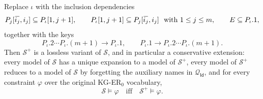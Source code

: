 \documentclass[10pt]{article}
\newcommand{\ols}[1]{\mskip.5\thinmuskip\overline{\mskip-.5\thinmuskip {#1} \mskip-.5\thinmuskip}\mskip.5\thinmuskip} %
\begin{document}
\noindent
Replace \(\iota\) with the inclusion dependencies
\[
P_j[\ols{i_j},i_j]\subseteq P_\iota[1,j+1],
\qquad
P_\iota[1,j+1]\subseteq P_j[\ols{i_j},i_j] ~\text{ with } 1\leq j\leq m,
\qquad
E\subseteq P_\iota.1,
\]
together with the keys
\[
P_\iota.2\cdots P_\iota.(m+1)\to P_\iota.1,\qquad
P_\iota.1\to P_\iota.2\cdots P_\iota.(m+1).
\]
Then \(\mathcal S^+\) is a lossless variant of \(\mathcal S\), and 
in particular a conservative extension: every model of \(\mathcal S\) has a
unique expansion to a model of \(\mathcal S^+\), every model of
\(\mathcal S^+\) reduces to a model of \(\mathcal S\) by forgetting the
auxiliary names in \(\mathcal Q_{\mathsf{Id}}\), and for every constraint
\(\varphi\) over the original KG-ER\(_0\) vocabulary,
\[
\mathcal S\models\varphi
\quad\text{iff}\quad
\mathcal S^+\models\varphi .
\]
\end{document}
